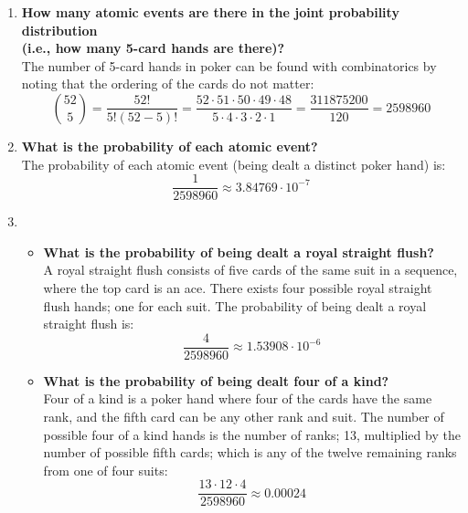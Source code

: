 \begin{enumerate}[label=\alph*)]
\item \textbf{How many atomic events are there in the joint probability distribution\\(i.e., how many 5-card hands are there)?}\\
The number of 5-card hands in poker can be found with combinatorics by noting that the ordering of the cards do not matter:
\begin{displaymath}
\binom{52}{5} =
\frac{52!}{5!(52 - 5)!} =
\frac{52 \cdot 51 \cdot 50 \cdot 49 \cdot 48}{5 \cdot 4 \cdot 3 \cdot 2 \cdot 1} =
\frac{311875200}{120} =
2598960
\end{displaymath}
\item \textbf{What is the probability of each atomic event?}\\
The probability of each atomic event (being dealt a distinct poker hand) is:
\begin{displaymath}
\frac{1}{2598960} \approx 3.84769 \cdot 10^{-7}
\end{displaymath}
\item
\begin{itemize}
\item \textbf{What is the probability of being dealt a royal straight flush?}\\
A royal straight flush consists of five cards of the same suit in a sequence, where the top card is an ace. There exists four possible royal straight flush hands; one for each suit. The probability of being dealt a royal straight flush is:
\begin{displaymath}
\frac{4}{2598960} \approx 1.53908 \cdot 10^{-6}
\end{displaymath}
\item \textbf{What is the probability of being dealt four of a kind?}\\
Four of a kind is a poker hand where four of the cards have the same rank, and the fifth card can be any other rank and suit. The number of possible four of a kind hands is the number of ranks; 13, multiplied by the number of possible fifth cards; which is any of the twelve remaining ranks from one of four suits:
\begin{displaymath}
\frac{13 \cdot 12 \cdot 4}{2598960} \approx 0.00024
\end{displaymath}
\end{itemize}
\end{enumerate}



